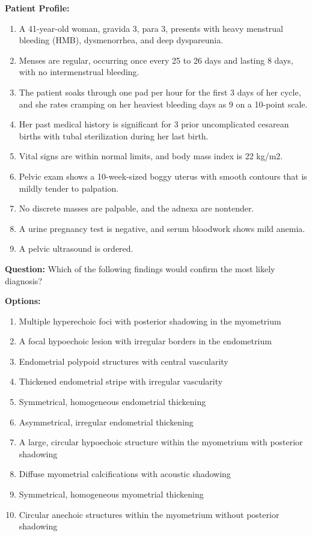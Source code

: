 \documentclass[11pt]{article}
\begin{document}
\begin{tcolorbox}[colback=blue!3!white, colframe=blue!50!white,
                  title=Example of QA Data (from MedXpert QA ID0200), left=10mm, breakable]
\small

\textbf{Patient Profile:}
\begin{enumerate}
  \item A 41-year-old woman, gravida 3, para 3, presents with heavy menstrual bleeding (HMB), dysmenorrhea, and deep dyspareunia.
  \item Menses are regular, occurring once every 25 to 26 days and lasting 8 days, with no intermenstrual bleeding.
  \item The patient soaks through one pad per hour for the first 3 days of her cycle, and she rates cramping on her heaviest bleeding days as 9 on a 10-point scale.
  \item Her past medical history is significant for 3 prior uncomplicated cesarean births with tubal sterilization during her last birth.
  \item Vital signs are within normal limits, and body mass index is 22 kg/m2.
  \item Pelvic exam shows a 10-week-sized boggy uterus with smooth contours that is mildly tender to palpation.
  \item No discrete masses are palpable, and the adnexa are nontender.
  \item A urine pregnancy test is negative, and serum bloodwork shows mild anemia.
  \item A pelvic ultrasound is ordered.
\end{enumerate}

\bigskip
\textbf{Question: }Which of the following findings would confirm the most likely diagnosis?

\bigskip
\textbf{Options:}
\begin{enumerate}[label=\Alph*.]
    \item Multiple hyperechoic foci with posterior shadowing in the myometrium
    \item A focal hypoechoic lesion with irregular borders in the endometrium
    \item Endometrial polypoid structures with central vascularity
    \item Thickened endometrial stripe with irregular vascularity
    \item Symmetrical, homogeneous endometrial thickening
    \item Asymmetrical, irregular endometrial thickening
    \item A large, circular hypoechoic structure within the myometrium with posterior shadowing
    \item Diffuse myometrial calcifications with acoustic shadowing
    \item Symmetrical, homogeneous myometrial thickening
    \item Circular anechoic structures within the myometrium without posterior shadowing
\end{enumerate}


\end{tcolorbox}
\end{document}
